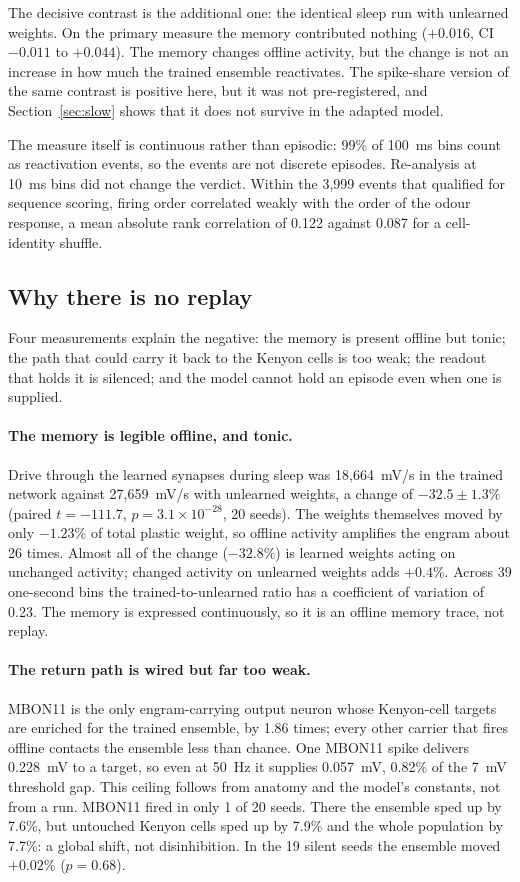 \documentclass[11pt]{article}
\begin{document}
The decisive contrast is the additional one: the identical sleep run with unlearned weights. On the primary measure the memory contributed nothing ($+0.016$, CI $-0.011$ to $+0.044$). The memory changes offline activity, but the change is not an increase in how much the trained ensemble reactivates. The spike-share version of the same contrast is positive here, but it was not pre-registered, and Section~\ref{sec:slow} shows that it does not survive in the adapted model.

The measure itself is continuous rather than episodic: 99\% of 100~ms bins count as reactivation events, so the events are not discrete episodes. Re-analysis at 10~ms bins did not change the verdict. Within the 3,999 events that qualified for sequence scoring, firing order correlated weakly with the order of the odour response, a mean absolute rank correlation of 0.122 against 0.087 for a cell-identity shuffle.

\subsection{Why there is no replay}
Four measurements explain the negative: the memory is present offline but tonic; the path that could carry it back to the Kenyon cells is too weak; the readout that holds it is silenced; and the model cannot hold an episode even when one is supplied.

\paragraph{The memory is legible offline, and tonic.} Drive through the learned synapses during sleep was 18,664~mV/s in the trained network against 27,659~mV/s with unlearned weights, a change of $-32.5 \pm 1.3\%$ (paired $t = -111.7$, $p = 3.1 \times 10^{-28}$, 20 seeds). The weights themselves moved by only $-1.23\%$ of total plastic weight, so offline activity amplifies the engram about 26 times. Almost all of the change ($-32.8\%$) is learned weights acting on unchanged activity; changed activity on unlearned weights adds $+0.4\%$. Across 39 one-second bins the trained-to-unlearned ratio has a coefficient of variation of 0.23. The memory is expressed continuously, so it is an offline memory trace, not replay.

\paragraph{The return path is wired but far too weak.} MBON11 is the only engram-carrying output neuron whose Kenyon-cell targets are enriched for the trained ensemble, by 1.86 times; every other carrier that fires offline contacts the ensemble less than chance. One MBON11 spike delivers 0.228~mV to a target, so even at 50~Hz it supplies 0.057~mV, 0.82\% of the 7~mV threshold gap. This ceiling follows from anatomy and the model's constants, not from a run. MBON11 fired in only 1 of 20 seeds. There the ensemble sped up by 7.6\%, but untouched Kenyon cells sped up by 7.9\% and the whole population by 7.7\%: a global shift, not disinhibition. In the 19 silent seeds the ensemble moved $+0.02\%$ ($p = 0.68$).
\end{document}
